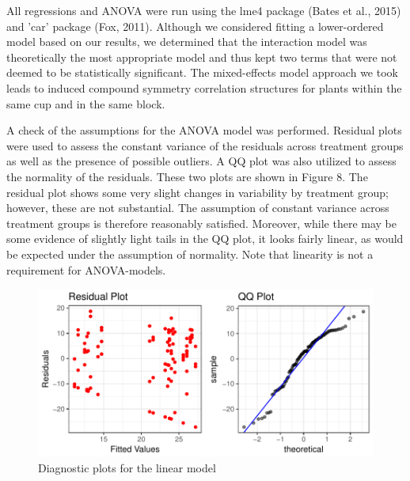 \documentclass[1p,12pt]{elsarticle}\usepackage[]{graphicx}\usepackage[]{color}
\makeatletter
\def\maxwidth{ %
  \ifdim\Gin@nat@width>\linewidth
    \linewidth
  \else
    \Gin@nat@width
  \fi
}
\newenvironment{knitrout}{}{} %
\makeatother
\begin{document}
All regressions and ANOVA were run using the lme4 package (Bates et al., 2015) and 'car' package (Fox, 2011).  Although we considered fitting a lower-ordered model based on our results, we determined that the interaction model was theoretically the most appropriate model and thus kept two terms that were not deemed to be statistically significant. The mixed-effects model approach we took leads to induced compound symmetry correlation structures for plants within the same cup and in the same block. 

A check of the assumptions for the ANOVA model was performed. Residual plots were used to assess the constant variance of the residuals across treatment groups as well as the presence of possible outliers. A QQ plot was also utilized to assess the normality of the residuals. These two plots are shown in Figure 8. The residual plot shows some very slight changes in variability by treatment group; however, these are not substantial.  The assumption of constant variance across treatment groups is therefore reasonably satisfied. Moreover, while there may be some evidence of slightly light tails in the QQ plot, it looks fairly linear, as would be expected under the assumption of normality.  Note that linearity is not a requirement for ANOVA-models.

\begin{knitrout}
\color{fgcolor}\begin{figure}

{\centering \includegraphics[width=\maxwidth]{figure/assess-1} 

}

\caption[Diagnostic plots for the linear model]{Diagnostic plots for the linear model}\label{fig:assess}
\end{figure}


\end{knitrout}
\end{document}

